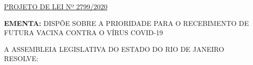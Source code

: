 \documentclass[10pt]{article}
\date{}
\begin{document}
\maketitle
\begin{center}
  \huge
  \vspace{-3cm}\href{http://alerjln1.alerj.rj.gov.br/scpro1923.nsf/f4b46b3cdbba990083256cc900746cf6/c5093f8c3ef3b9620325859200535c17?OpenDocument}{PROJETO DE LEI Nº 2799/2020}
\bigskip
\bigskip
\bigskip
  
\end{center}

\textbf{EMENTA:} 
DISPÕE SOBRE A PRIORIDADE PARA O RECEBIMENTO DE FUTURA VACINA CONTRA O VÍRUS COVID-19








\bigskip

\noindent
A ASSEMBLEIA LEGISLATIVA DO ESTADO DO RIO DE JANEIRO RESOLVE:
\end{document}

